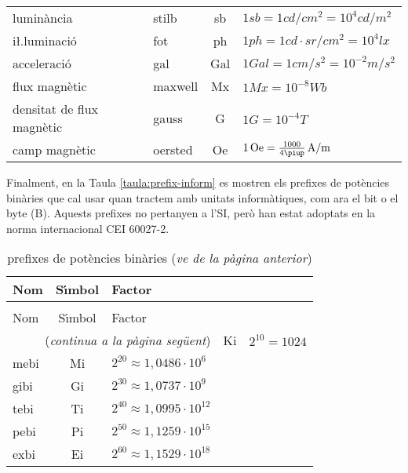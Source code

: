\begin{longtable}[h]{llcl}
    lumin\`{a}ncia & stilb & \unit{sb} & $1\unit{sb} = 1\unit{cd/cm^2} = 10^4\unit{cd/m^2}$ \\
    i{\l.l}uminaci\'{o} & fot & \unit{ph} & $1\unit{ph} = 1\unit{cd\cdot sr/cm^2} = 10^4\unit{lx}$ \\
    acceleraci\'{o} & gal & \unit{Gal} & $1\unit{Gal} = 1\unit{cm/s^2} = 10^{-2}\unit{m/s^2}$ \\
    flux magn\`{e}tic & maxwell & \unit{Mx} & $1\unit{Mx} = 10^{-8}\unit{Wb}$ \\
    densitat de flux magn\`{e}tic & gauss & \unit{G} & $1\unit{G} = 10^{-4}\unit{T}$ \\
    camp magn\`{e}tic & oersted & \unit{Oe} & $1\unit{Oe} = \frac{1000}{4\piup}\unit{A/m}$ \\
\bottomrule[1pt]
\end{longtable}

\break
Finalment, en la Taula \vref{taula:prefix-inform} es mostren els prefixes de pot\`{e}ncies bin\`{a}ries que cal usar quan tractem amb unitats inform\`{a}tiques, com ara el bit o el byte (B). Aquests prefixes no pertanyen a l'SI, per\`{o} han estat adoptats en la norma internacional \textsf{CEI 60027-2}.

\begin{longtable}[h]{lcl}
   \caption{\label{taula:prefix-inform} prefixes de pot\`{e}ncies bin\`{a}ries}\\
   \toprule[1pt]
    Nom & S\'{\i}mbol  & Factor \\
   \midrule
   \endfirsthead
   \caption[]{prefixes de pot\`{e}ncies bin\`{a}ries (\emph{ve de la p\`{a}gina
   anterior})}\\
   \toprule[1pt]
    Nom & S\'{\i}mbol  & Factor \\
   \midrule
   \endhead
   \midrule
   \multicolumn{3}{r}{(\emph{continua a la p\`{a}gina seg\"{u}ent})}
   \endfoot
   \endlastfoot
   kibi & Ki   & $2^{10} = 1024$  \\
   mebi & Mi   & $2^{20} \approx 1{,}0486\cdot10^6$ \\
   gibi & Gi   & $2^{30} \approx 1{,}0737\cdot10^9$  \\
   tebi & Ti   & $2^{40} \approx 1{,}0995\cdot10^{12}$ \\
   pebi & Pi   & $2^{50} \approx 1{,}1259\cdot10^{15}$ \\
   exbi & Ei   & $2^{60} \approx 1{,}1529\cdot10^{18}$ \\
   \bottomrule[1pt]
\end{longtable}
        
   

